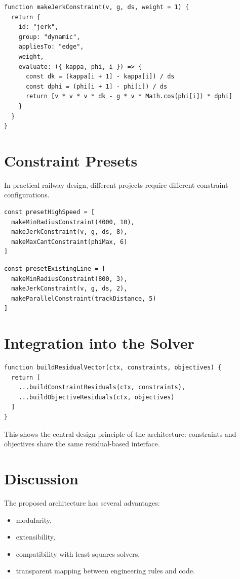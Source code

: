 \begin{verbatim}
function makeJerkConstraint(v, g, ds, weight = 1) {
  return {
    id: "jerk",
    group: "dynamic",
    appliesTo: "edge",
    weight,
    evaluate: ({ kappa, phi, i }) => {
      const dk = (kappa[i + 1] - kappa[i]) / ds
      const dphi = (phi[i + 1] - phi[i]) / ds
      return [v * v * v * dk - g * v * Math.cos(phi[i]) * dphi]
    }
  }
}
\end{verbatim}

\section{Constraint Presets}

In practical railway design, different projects require different
constraint configurations.

\begin{verbatim}
const presetHighSpeed = [
  makeMinRadiusConstraint(4000, 10),
  makeJerkConstraint(v, g, ds, 8),
  makeMaxCantConstraint(phiMax, 6)
]
\end{verbatim}

\begin{verbatim}
const presetExistingLine = [
  makeMinRadiusConstraint(800, 3),
  makeJerkConstraint(v, g, ds, 2),
  makeParallelConstraint(trackDistance, 5)
]
\end{verbatim}

\section{Integration into the Solver}

\begin{verbatim}
function buildResidualVector(ctx, constraints, objectives) {
  return [
    ...buildConstraintResiduals(ctx, constraints),
    ...buildObjectiveResiduals(ctx, objectives)
  ]
}
\end{verbatim}

This shows the central design principle of the architecture:
constraints and objectives share the same residual-based interface.

\section{Discussion}

The proposed architecture has several advantages:
\begin{itemize}
\item modularity,
\item extensibility,
\item compatibility with least-squares solvers,
\item transparent mapping between engineering rules and code.
\end{itemize}

